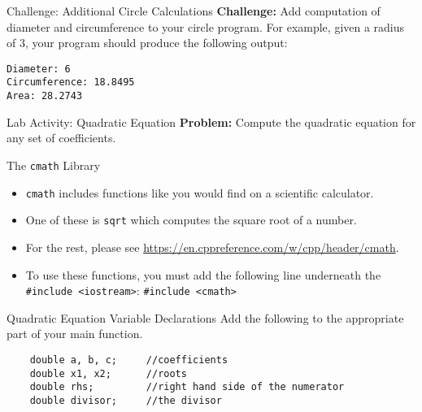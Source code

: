 \documentclass[]{beamer}
\begin{document}
\begin{frame}[fragile]{Challenge: Additional Circle Calculations}
    \textbf{Challenge:} Add computation of diameter and circumference 
    to your circle program.  
    \newline\newline 
    For example, given a radius of $3$, your program should produce the following output:
    \newline\newline
\begin{BVerbatim}
Diameter: 6
Circumference: 18.8495
Area: 28.2743
\end{BVerbatim}
\end{frame}

\begin{frame}{Lab Activity: Quadratic Equation}
    \textbf{Problem:} Compute the quadratic equation for any set of
    coefficients.

\end{frame}

\begin{frame}{The \texttt{cmath} Library}
    \begin{itemize}[<+->]
        \item \texttt{cmath} includes functions like you would find on
            a scientific calculator.
        \item One of these is \texttt{sqrt} which computes the square
            root of a number.
        \item For the rest, please see
        \newline\url{https://en.cppreference.com/w/cpp/header/cmath}.
        \item To use these functions, you must add the following line
            underneath the \texttt{\#include <iostream>}:
        \newline\texttt{\#include <cmath>}
    \end{itemize}
\end{frame}

\begin{frame}[fragile]{Quadratic Equation Variable Declarations}
    Add the following to the appropriate part of your main function.
    \newline\newline
\begin{adjustbox}{max width=0.95\textwidth, max height=0.9\textheight}
\begin{BVerbatim}
    double a, b, c;     //coefficients
    double x1, x2;      //roots
    double rhs;         //right hand side of the numerator
    double divisor;     //the divisor
\end{BVerbatim}
\end{adjustbox}
\end{frame}
\end{document}

